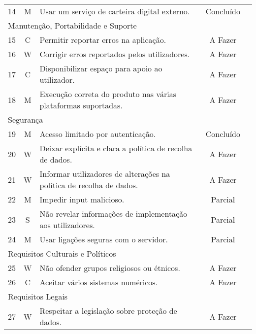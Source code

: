\begin{center}
\begin{longtable}{@{}lcp{}cp{}@{}}
    14  & M & Usar um serviço de carteira digital externo. & Concluído &  \\
    \multicolumn{5}{l}{\color{gray} Manutenção, Portabilidade e Suporte} \\
    15  & C & Permitir reportar erros na aplicação. & A Fazer &  \\
    16  & W & Corrigir erros reportados pelos utilizadores. & A Fazer &  \\
    17  & C & Disponibilizar espaço para apoio ao utilizador. & A Fazer &  \\
    18  & M & Execução correta do produto nas várias plataformas suportadas. & A Fazer &  \\
    \multicolumn{5}{l}{\color{gray} Segurança} \\
    19  & M & Acesso limitado por autenticação. & Concluído &  \\
    20  & W & Deixar explícita e clara a política de recolha de dados. & A Fazer &  \\
    21  & W & Informar utilizadores de alterações na política de recolha de dados. & A Fazer &  \\
    22  & M & Impedir input malicioso. & Parcial &  \\
    23  & S & Não revelar informações de implementação aos utilizadores. & Parcial &  \\
    24  & M & Usar ligações seguras com o servidor. & Parcial &  \\
    \multicolumn{5}{l}{\color{gray} Requisitos Culturais e Políticos} \\
    25  & W & Não ofender grupos religiosos ou étnicos. & A Fazer &  \\
    26  & C & Aceitar vários sistemas numéricos. & A Fazer &  \\
    \multicolumn{5}{l}{\color{gray} Requisitos Legais} \\
    27  & W & Respeitar a legislação sobre proteção de dados. & A Fazer & 
\end{longtable}
\end{center}
